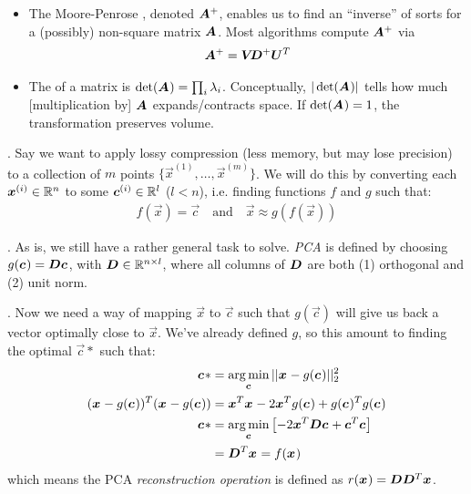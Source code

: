 \documentclass[11pt]{article}
\begin{document}
\begin{itemize}
	\item The Moore-Penrose , denoted $\bm{A}_{}^+$, enables us to find an ``inverse'' of sorts for a (possibly) non-square matrix $\bm{A}_{}$. Most algorithms compute $\bm{A}_{}^+$ via
	\begin{align}
		\bm{A}_{}^+ = \bm{V}_{} \bm{D}_{}^{+} \bm{U}_{}^T 
	\end{align}
	
	
	\item The  of a matrix is $\det(\bm{A}_{}) = \prod_i \lambda_i$. Conceptually, $|\det(\bm{A}_{})|$ tells how much [multiplication by] $\bm{A}_{}$ expands/contracts space. If $\det(\bm{A}_{}) = 1$, the transformation preserves volume.
\end{itemize}


\myspace
\p {}. Say we want to apply lossy compression (less memory, but may lose precision) to a collection of $m$ points $\{\vec{x}^{(1)}, \ldots, \vec{x}^{(m)} \}$. We will do this by converting each $\bm{x}_{}^{(i)} \in \mathbb{R}^n$ to some $\bm{c}_{}^{(i)} \in \mathbb{R}^l$ ($l < n$), i.e. finding functions $f$ and $g$ such that:
\begin{align}
	f(\vec{x}) = \vec{c} \quad \text{and} \quad \vec{x} \approx g(f(\vec{x}))
\end{align}


\myspace
\p {}. As is, we still have a rather general task to solve. \textit{PCA} is defined by choosing $g(\bm{c}_{}) = \bm{D}_{}\bm{c}_{}$, with $\bm{D}_{} \in \mathbb{R}^{n \times l}$, where all columns of $\bm{D}_{}$ are both (1) orthogonal and (2) unit norm.

\myspace
\p {}. Now we need a way of mapping $\vec{x}$ to $\vec{c}$ such that $g(\vec{c})$ will give us back a vector optimally close to $\vec{x}$. We've already defined $g$, so this amount to finding the optimal $\vec{c}*$ such that:
\begin{align}
	\bm{c}_{}* &= \operatorname*{arg\,min}_{\bm{c}_{}} || \bm{x}_{} - g(\bm{c}_{}) ||_2^2 \\
	(\bm{x}_{} - g(\bm{c}_{}))^T (\bm{x}_{} - g(\bm{c}_{})) &= \bm{x}_{}^T\bm{x}_{} - 2 \bm{x}_{}^T g(\bm{c}_{}) + g(\bm{c}_{})^T g(\bm{c}_{}) \\
	\bm{c}_{}* &= \operatorname*{arg\,min}_{\bm{c}_{}} \left[ -2 \bm{x}_{}^T \bm{D}_{} \bm{c}_{} + \bm{c}_{}^T \bm{c}_{} \right] \\
	&= \bm{D}_{}^T \bm{x}_{} = f(\bm{x}_{})
\end{align}
which means the PCA \textit{reconstruction operation} is defined as $r(\bm{x}_{}) = \bm{D}_{} \bm{D}_{}^T \bm{x}_{}$.
\end{document}

